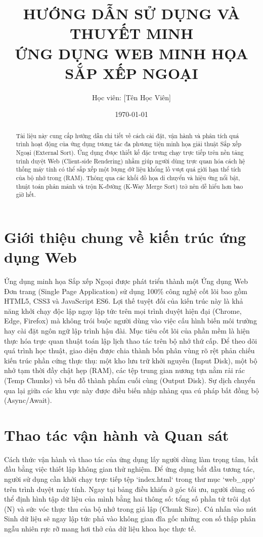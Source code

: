 \documentclass[a4paper,12pt]{article}
\title{\textbf{HƯỚNG DẪN SỬ DỤNG VÀ THUYẾT MINH \\ ỨNG DỤNG WEB MINH HỌA SẮP XẾP NGOẠI}}
\author{Học viên: [Tên Học Viên]}
\date{\today}
\begin{document}
\maketitle

\begin{abstract}
Tài liệu này cung cấp hướng dẫn chi tiết về cách cài đặt, vận hành và phân tích quá trình hoạt động của ứng dụng tương tác đa phương tiện minh họa giải thuật Sắp xếp Ngoại (External Sort). Ứng dụng được thiết kế đặc trưng chạy trực tiếp trên nền tảng trình duyệt Web (Client-side Rendering) nhằm giúp người dùng trực quan hóa cách hệ thống máy tính có thể sắp xếp một lượng dữ liệu khổng lồ vượt quá giới hạn thể tích của bộ nhớ trong (RAM). Thông qua các khối đồ họa di chuyển và hiệu ứng nổi bật, thuật toán phân mảnh và trộn K-đường (K-Way Merge Sort) trở nên dễ hiểu hơn bao giờ hết.
\end{abstract}

\section{Giới thiệu chung về kiến trúc ứng dụng Web}

Ứng dụng minh họa Sắp xếp Ngoại được phát triển thành một Ứng dụng Web Đơn trang (Single Page Application) sử dụng 100\% công nghệ cốt lõi bao gồm HTML5, CSS3 và JavaScript ES6. Lợi thế tuyệt đối của kiến trúc này là khả năng khởi chạy độc lập ngay lập tức trên mọi trình duyệt hiện đại (Chrome, Edge, Firefox) mà không trói buộc người dùng vào việc cấu hình biến môi trường hay cài đặt ngôn ngữ lập trình hậu đài. Mục tiêu cốt lõi của phần mềm là hiện thực hóa trực quan thuật toán lập lịch thao tác trên bộ nhớ thứ cấp. Để theo dõi quá trình học thuật, giao diện được chia thành bốn phân vùng rõ rệt phản chiếu kiến trúc phần cứng thực thụ: một kho lưu trữ khởi nguyên (Input Disk), một bộ nhớ tạm thời đầy chật hẹp (RAM), các tệp trung gian nương tựa nằm rải rác (Temp Chunks) và bến đỗ thành phẩm cuối cùng (Output Disk). Sự dịch chuyển qua lại giữa các khu vực này được điều biến nhịp nhàng qua cú pháp bất đồng bộ (Async/Await).

\section{Thao tác vận hành và Quan sát}

Cách thức vận hành và thao tác của ứng dụng lấy người dùng làm trọng tâm, bắt đầu bằng việc thiết lập không gian thử nghiệm. Để ứng dụng bắt đầu tương tác, người sử dụng cần khởi chạy trực tiếp tệp `index.html` trong thư mục `web_app` trên trình duyệt máy tính. Ngay tại bảng điều khiển ở góc tối ưu, người dùng có thể định hình tập dữ liệu của mình bằng hai thông số: tổng số phần tử trôi dạt (N) và sức vóc thực thu của bộ nhớ trong giả lập (Chunk Size). Cú nhấn vào nút Sinh dữ liệu sẽ ngay lập tức phả vào không gian đĩa gốc những con số thập phân ngẫu nhiên rực rỡ mang hơi thở của dữ liệu khoa học thực tế. 
\end{document}
